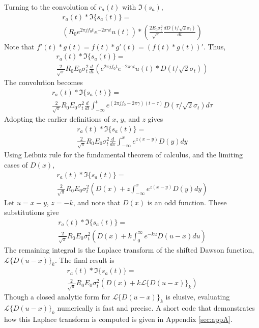 \documentclass[amsmath,amssymb,aps,prd,10pt,twocolumn,showkeys]{revtex4}
\begin{document}
Turning to the convolution of $r_a(t)$ with $\Im(s_a)$,
\begin{multline}
r_a(t) * \Im\lbrace s_a(t) \rbrace = \\ \left(R_0 e^{2\pi j f_0 t} e^{-2\pi \gamma t} u(t)\right) * \left(\frac{2 E_0 \sigma_t^2}{\sqrt{\pi}}\frac{dD(t/\sqrt{2}\sigma_t)}{dt} \right)
\end{multline}
Note that $f'(t) * g(t) = f(t) * g'(t) = (f(t) * g(t))'$.  Thus,
\begin{multline}
r_a(t) * \Im\lbrace s_a(t) \rbrace = \\ \frac{2}{\sqrt{\pi}} R_0 E_0 \sigma_t^2 \frac{d}{dt}\left(e^{2\pi j f_0 t}e^{-2\pi\gamma t} u(t) * D(t/\sqrt{2}\sigma_t) \right)
\end{multline}
The convolution becomes
\begin{multline}
r_a(t) * \Im\lbrace s_a(t) \rbrace = \\ \frac{2}{\sqrt{\pi}} R_0 E_0 \sigma_t^2 \frac{d}{dt} \int_{-\infty}^{t} e^{(2\pi j f_0 - 2\pi\gamma)(t-\tau)}D(\tau/\sqrt{2}\sigma_t)d\tau
\end{multline}
Adopting the earlier definitions of $x$, $y$, and $z$ gives
\begin{multline}
r_a(t) * \Im\lbrace s_a(t) \rbrace = \\ \frac{2}{\sqrt{\pi}} R_0 E_0 \sigma_t^2 \frac{d}{dx} \int_{-\infty}^{x} e^{z(x-y)} D(y) dy
\end{multline}
Using Leibniz rule for the fundamental theorem of calculus, and the limiting cases of $D(x)$,
\begin{multline}
r_a(t) * \Im\lbrace s_a(t) \rbrace = \\ \frac{2}{\sqrt{\pi}} R_0 E_0 \sigma_t^2 \left(D(x) + z\int_{-\infty}^{x} e^{z(x-y)} D(y) dy \right)
\end{multline}
Let $u = x-y$, $z=-k$, and note that $D(x)$ is an odd function.  These substitutions give
\begin{multline}
r_a(t) * \Im\lbrace s_a(t) \rbrace = \\ \frac{2}{\sqrt{\pi}} R_0 E_0 \sigma_t^2 \left(D(x) + k\int_{0}^{\infty} e^{-ku} D(u-x) du \right)
\end{multline}
The remaining integral is the Laplace transform of the shifted Dawson function, $\mathcal{L}\lbrace D(u-x)\rbrace_k$.  The final result is
\begin{multline}
r_a(t) * \Im\lbrace s_a(t) \rbrace = \\ \frac{2}{\sqrt{\pi}} R_0 E_0 \sigma_t^2 \left(D(x) + k\mathcal{L}\lbrace D(u-x)\rbrace_k\right) \label{eq:Im_result}
\end{multline}
Though a closed analytic form for $\mathcal{L}\lbrace D(u-x)\rbrace_k$ is elusive, evaluating $\mathcal{L}\lbrace D(u-x)\rbrace_k$ numerically is fast and precise. A short code that demonstrates how this Laplace transform is computed is given in Appendix \ref{sec:appA}.
\end{document}
